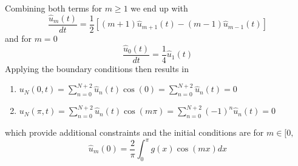 Combining both terms for $m \geq 1$ we end up with
\begin{equation}
	\frac{\hat{u}_m (t)}{dt} = \frac{1}{2} \left [ (m+1) \hat{u}_{m+1}(t) - (m-1)\hat{u}_{m-1}(t)\right]
	\label{eq:sol3a}
\end{equation}
and for $m=0$
\begin{equation}
	\frac{\hat{u}_0 (t)}{dt} = \frac{1}{4}\hat{u}_1(t)
	\label{eq:sol3b}
\end{equation}
Applying the boundary conditions then results in
\begin{enumerate}
	\item $u_N(0,t) = \sum_{n=0}^{N+2} \hat{u}_n (t) \cos(0) =  \sum_{n=0}^{N+2} \hat{u}_n (t) = 0$
	\item $u_N(\pi,t) = \sum_{n=0}^{N+2} \hat{u}_n (t) \cos(m\pi) =  \sum_{n=0}^{N+2} (-1)^n \hat{u}_n (t) = 0$
\end{enumerate}
which provide additional constraints and the initial conditions are for $m\in [0,$
\begin{equation}
	\hat{u}_m(0) = \frac{2}{\pi}\int_0^{\pi} g(x)\cos(mx)dx
	\label{eq:init3}
\end{equation}
